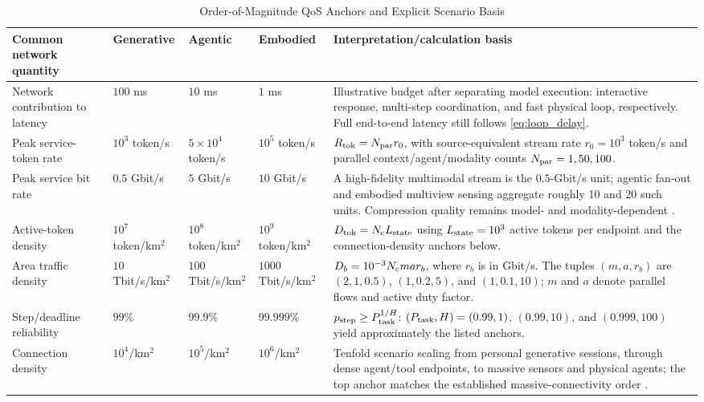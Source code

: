\documentclass[letterpaper,journal]{IEEEtran}
\begin{document}
\begin{table}[t]
\caption{Order-of-Magnitude QoS Anchors and Explicit Scenario Basis}
\label{tab:qos}
\centering
\scriptsize
\renewcommand{\arraystretch}{1.17}
\setlength{\tabcolsep}{2.6pt}
\begin{tabular}{|p{}|p{}|p{}|p{}|p{}|}
\hline
\textbf{Common network quantity} & \textbf{Generative} &
\textbf{Agentic} & \textbf{Embodied} & \textbf{Interpretation/calculation
basis} \\ \hline
Network contribution to latency & $100$ ms & $10$ ms & $1$ ms &
Illustrative budget after separating model execution: interactive response,
multi-step coordination, and fast physical loop, respectively. Full
end-to-end latency still follows \eqref{eq:loop_delay}. \\ \hline
Peak service-token rate & $10^3$ token/s & $5\!\times\!10^4$ token/s &
$10^5$ token/s & $R_{\rm tok}=N_{\rm par}r_0$, with source-equivalent stream
rate $r_0=10^3$ token/s and parallel context/agent/modality counts
$N_{\rm par}=1,50,100$. \\ \hline
Peak service bit rate & $0.5$ Gbit/s & $5$ Gbit/s & $10$ Gbit/s &
A high-fidelity multimodal stream is the $0.5$-Gbit/s unit; agentic fan-out and
embodied multiview sensing aggregate roughly 10 and 20 such units. Compression
quality remains model- and modality-dependent \cite{evatok,edgeLLMsurvey}.
\\ \hline
Active-token density & $10^7$ token/km$^2$ & $10^8$ token/km$^2$ &
$10^9$ token/km$^2$ & $D_{\rm tok}=N_{\rm c}L_{\rm state}$ using
$L_{\rm state}=10^3$ active tokens per endpoint and the connection-density
anchors below. \\ \hline
Area traffic density & $10$ Tbit/s/km$^2$ & $100$ Tbit/s/km$^2$ &
$1000$ Tbit/s/km$^2$ & $D_b=10^{-3}N_{\rm c}ma r_b$, where $r_b$ is in
Gbit/s. The tuples $(m,a,r_b)$ are $(2,1,0.5)$, $(1,0.2,5)$, and
$(1,0.1,10)$; $m$ and $a$ denote parallel flows and active duty factor.
\\ \hline
Step/deadline reliability & $99\%$ & $99.9\%$ & $99.999\%$ &
$p_{\rm step}\ge P_{\rm task}^{1/H}$: $(P_{\rm task},H)=(0.99,1)$,
$(0.99,10)$, and $(0.999,100)$ yield approximately the listed anchors.
\\ \hline
Connection density & $10^4$/km$^2$ & $10^5$/km$^2$ & $10^6$/km$^2$ &
Tenfold scenario scaling from personal generative sessions, through dense
agent/tool endpoints, to massive sensors and physical agents; the top anchor
matches the established massive-connectivity order \cite{3gpp22870}. \\ \hline
\end{tabular}
\end{table}
\end{document}
